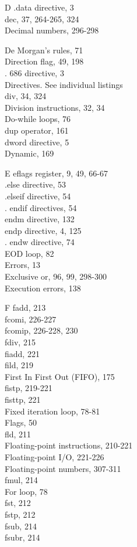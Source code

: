 \documentclass[10pt]{book}
\begin{document}
D
.data directive, 3\\
dec, 37, 264-265, 324\\
Decimal numbers, 296-298

De Morgan's rules, 71\\
Direction flag, 49, 198\\
. 686 directive, 3\\
Directives. See individual listings\\
div, 34, 324\\
Division instructions, 32, 34\\
Do-while loops, 76\\
dup operator, 161\\
dword directive, 5\\
Dynamic, 169

E
eflags register, 9, 49, 66-67\\
.else directive, 53\\
.elseif directive, 54\\
. endif directives, 54\\
endm directive, 132\\
endp directive, 4, 125\\
. endw directive, 74\\
EOD loop, 82\\
Errors, 13\\
Exclusive or, 96, 99, 298-300\\
Execution errors, 138

F
fadd, 213\\
fcomi, 226-227\\
fcomip, 226-228, 230\\
fdiv, 215\\
fiadd, 221\\
fild, 219\\
First In First Out (FIFO), 175\\
fistp, 219-221\\
fisttp, 221\\
Fixed iteration loop, 78-81\\
Flags, 50\\
fld, 211\\
Floating-point instructions, 210-221\\
Floating-point I/O, 221-226\\
Floating-point numbers, 307-311\\
fmul, 214\\
For loop, 78\\
fst, 212\\
fstp, 212\\
fsub, 214\\
fsubr, 214
\end{document}
